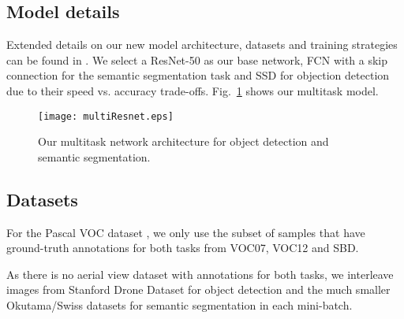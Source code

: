\subsection{Model details}

Extended details on our new model architecture, datasets and training strategies can be found in \cite{thesismiquel}. We select a ResNet-50 \cite{Residual} as our base network, FCN with a skip connection for the semantic segmentation task and SSD for objection detection due to their speed vs. accuracy trade-offs. Fig.~\ref{multinet} shows our multitask model.

\begin{figure}[t]
 \centering
  \texttt{[image: multiResnet.eps]}
  \vspace{-5mm}
  \caption{Our multitask network architecture for object detection and semantic segmentation.}
  \label{multinet}
\end{figure}

\subsection{Datasets}

For the Pascal VOC dataset \cite{PascalRetro}, we only use the subset of samples that have ground-truth annotations for both tasks from VOC07, VOC12 and SBD\cite{SBD}.

As there is no aerial view dataset with annotations for both tasks, we interleave images from Stanford Drone Dataset \cite{StanfordDrone} for object detection and the much smaller Okutama/Swiss \cite{Laurmaa} datasets for semantic segmentation in each mini-batch.